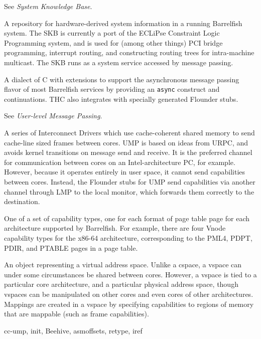 \item[SKB:] See \textit{System Knowledge Base}.

\item[System Knowledge Base \textrm{\textit{(SKB)}}:] A repository for hardware-derived system information in a running Barrelfish system.  The SKB is currently a port of the ECLiPse Constraint Logic Programming system, and is used for (among other things) PCI bridge programming, interrupt routing, and constructing routing trees for intra-machine multicast. The SKB runs as a system service accessed by message passing.

\item[THC:] A dialect of C with extensions to support the asynchronous message passing flavor of most Barrelfish services by providing an \texttt{async} construct and continuations.  THC also integrates with specially generated Flounder stubs.

\item[UMP:] See \textit{User-level Message Passing}.

\item[User-level Message Passing \textrm{\textit{(UMP, CC-UMP)}}:] A series of Interconnect Drivers which use cache-coherent shared memory to send cache-line sized frames between cores.  UMP is based on ideas from URPC, and avoids kernel transitions on message send and receive.  It is the preferred channel for communication between cores on an Intel-architecture PC, for example.  However, because it operates entirely in user space, it cannot send capabilities between cores.  Instead, the Flounder stubs for UMP send capabilities via another channel through LMP to the local monitor, which forwards them correctly to the destination.

\item[vnode capability:] One of a set of capability types, one for each format of page table page for each architecture supported by Barrelfish.  For example, there are four Vnode capability types for the x86-64 architecture, corresponding to the PML4, PDPT, PDIR, and PTABLE pages in a page table.

\item[vspace:] An object representing a virtual address space.  Unlike a cspace, a vspace can under some circumstances be shared between cores.  However, a vspace is tied to a particular core architecture, and a particular physical address space, though vspaces can be manipulated on other cores and even cores of other architectures.  Mappings are created in a vspace by specifying capabilities to regions of memory that are mappable (such as frame capabilities).

\item[ZZZ terms yet to be added:] cc-ump, init, Beehive, asmoffsets, retype, iref


